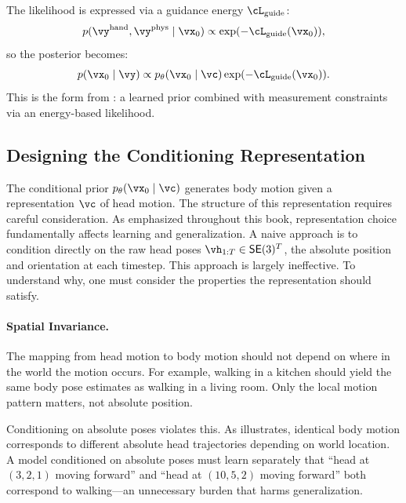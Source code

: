 \documentclass[../../book-main.tex]{subfiles}
\begin{document}
The likelihood is expressed via a guidance energy \(\cL_{\mathrm{guide}}\):
\begin{equation}
    p(\vy^{\mathrm{hand}}, \vy^{\mathrm{phys}} \mid
    \vx_{0}) \propto \exp(-\cL_{\mathrm{guide}}(\vx_{0})) ,
\end{equation}
so the posterior becomes:
\begin{equation}
    \label{eq:egoallo_posterior}
    p(\vx_{0} \mid \vy) \propto
    p_{\theta}(\vx_{0} \mid
    \vc) \exp(-\cL_{\mathrm{guide}}(\vx_{0})) .
\end{equation}
This is the form from : a
learned prior combined with measurement constraints via an
energy-based likelihood.

\subsection{Designing the Conditioning Representation}
\label{sub:egoallo_representation}

The conditional prior \(p_{\theta}(\vx_{0} \mid \vc)\) generates
body motion given a representation \(\vc\) of head motion. The structure
of this representation requires careful consideration. As emphasized throughout this
book, representation choice fundamentally affects learning and generalization.
A naive approach is to condition directly on the raw head poses
\(\vh_{1:T} \in \mathsf{SE}(3)^{T}\), the absolute position and orientation
at each timestep. This approach is largely ineffective. To understand why, one
must consider the properties the representation should satisfy.

\paragraph{Spatial Invariance.}
The mapping from head motion to body motion should not depend on
where in the world the motion occurs. For example, walking in a kitchen should
yield the same body pose estimates as walking in a living room.
Only the local motion pattern matters, not absolute position.

Conditioning on absolute poses violates this. As
 illustrates, identical body
motion corresponds to different absolute head trajectories depending
on world location. A model conditioned on absolute poses must learn
separately that ``head at \((3,2,1)\) moving forward'' and ``head at
\((10,5,2)\) moving forward'' both correspond to walking---an
unnecessary burden that harms generalization.
\end{document}
